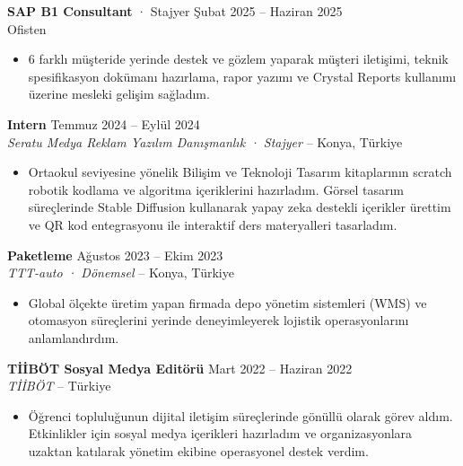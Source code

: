 \documentclass[a4paper,8pt]{article}
\begin{document}
\vspace{3pt}
{\small \textbf{SAP B1 Consultant} · Stajyer \hfill Şubat 2025 -- Haziran 2025}\\
{\small Ofisten}
\begin{itemize}
\item {\small 6 farklı müşteride yerinde destek ve gözlem yaparak müşteri iletişimi, teknik spesifikasyon dokümanı hazırlama, rapor yazımı ve Crystal Reports kullanımı üzerine mesleki gelişim sağladım.}
\end{itemize}

\vspace{3pt}

\textbf{Intern} \hfill {\small Temmuz 2024 -- Eylül 2024}\\
{\small \textit{Seratu Medya Reklam Yazılım Danışmanlık · Stajyer} -- Konya, Türkiye}
\begin{itemize}
\item {\small Ortaokul seviyesine yönelik Bilişim ve Teknoloji Tasarım kitaplarının scratch robotik kodlama ve algoritma içeriklerini hazırladım. Görsel tasarım süreçlerinde Stable Diffusion kullanarak yapay zeka destekli içerikler ürettim ve QR kod entegrasyonu ile interaktif ders materyalleri tasarladım.}
\end{itemize}

\vspace{3pt}

\textbf{Paketleme} \hfill {\small Ağustos 2023 -- Ekim 2023}\\
{\small \textit{TTT-auto · Dönemsel} -- Konya, Türkiye}
\begin{itemize}
\item {\small Global ölçekte üretim yapan firmada depo yönetim sistemleri (WMS) ve otomasyon süreçlerini yerinde deneyimleyerek lojistik operasyonlarını anlamlandırdım.}
\end{itemize}

\vspace{3pt}

\textbf{TİİBÖT Sosyal Medya Editörü} \hfill {\small Mart 2022 -- Haziran 2022}\\
{\small \textit{TİİBÖT} -- Türkiye}
\begin{itemize}
\item {\small Öğrenci topluluğunun dijital iletişim süreçlerinde gönüllü olarak görev aldım. Etkinlikler için sosyal medya içerikleri hazırladım ve organizasyonlara uzaktan katılarak yönetim ekibine operasyonel destek verdim.}
\end{itemize}
\end{document}
